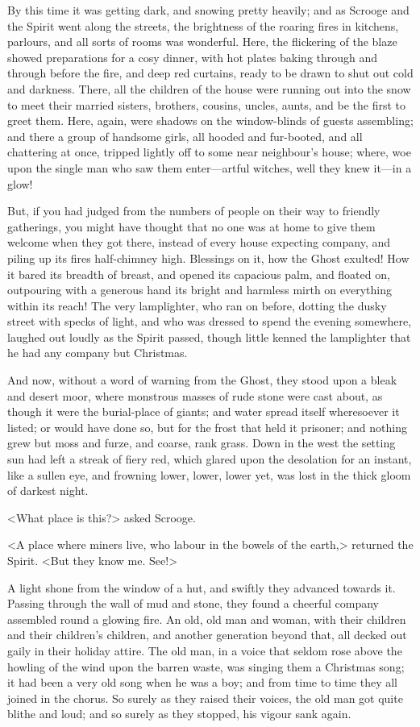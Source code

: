 By this time it was getting dark, and snowing pretty heavily; and as Scrooge and
the Spirit went along the streets, the brightness of the roaring fires in
kitchens, parlours, and all sorts of rooms was wonderful. Here, the flickering
of the blaze showed preparations for a cosy dinner, with hot plates baking
through and through before the fire, and deep red curtains, ready to be drawn to
shut out cold and darkness. There, all the children of the house were running
out into the snow to meet their married sisters, brothers, cousins, uncles,
aunts, and be the first to greet them. Here, again, were shadows on the
window-blinds of guests assembling; and there a group of handsome girls, all
hooded and fur-booted, and all chattering at once, tripped lightly off to some
near neighbour's house; where, woe upon the single man who saw them enter—artful
witches, well they knew it—in a glow!

But, if you had judged from the numbers of people on their way to friendly
gatherings, you might have thought that no one was at home to give them welcome
when they got there, instead of every house expecting company, and piling up its
fires half-chimney high. Blessings on it, how the Ghost exulted! How it bared
its breadth of breast, and opened its capacious palm, and floated on, outpouring
with a generous hand its bright and harmless mirth on everything within its
reach! The very lamplighter, who ran on before, dotting the dusky street with
specks of light, and who was dressed to spend the evening somewhere, laughed out
loudly as the Spirit passed, though little kenned the lamplighter that he had
any company but Christmas.

And now, without a word of warning from the Ghost, they stood upon a bleak and
desert moor, where monstrous masses of rude stone were cast about, as though it
were the burial-place of giants; and water spread itself wheresoever it listed;
or would have done so, but for the frost that held it prisoner; and nothing grew
but moss and furze, and coarse, rank grass. Down in the west the setting sun had
left a streak of fiery red, which glared upon the desolation for an instant,
like a sullen eye, and frowning lower, lower, lower yet, was lost in the thick
gloom of darkest night.

<What place is this?> asked Scrooge.

<A place where miners live, who labour in the bowels of the earth,> returned the
Spirit. <But they know me. See!>

A light shone from the window of a hut, and swiftly they advanced towards it.
Passing through the wall of mud and stone, they found a cheerful company
assembled round a glowing fire. An old, old man and woman, with their children
and their children's children, and another generation beyond that, all decked
out gaily in their holiday attire. The old man, in a voice that seldom rose
above the howling of the wind upon the barren waste, was singing them a
Christmas song; it had been a very old song when he was a boy; and from time to
time they all joined in the chorus. So surely as they raised their voices, the
old man got quite blithe and loud; and so surely as they stopped, his vigour
sank again.

